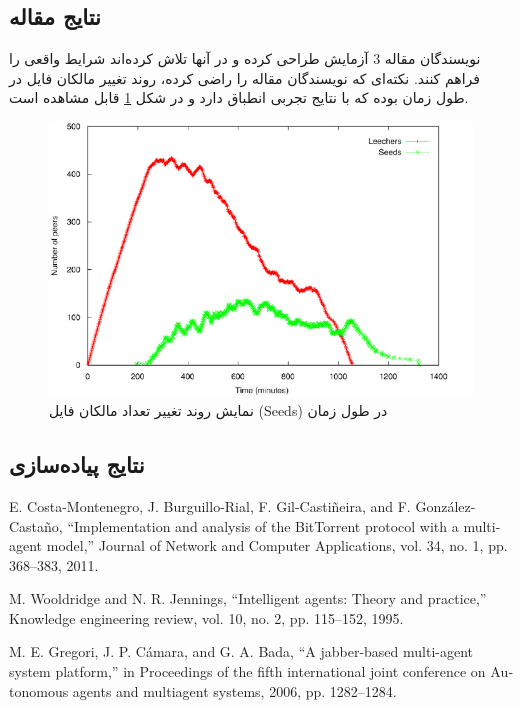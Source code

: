 \documentclass{article}
\begin{document}
\subsection{نتایج مقاله}
نویسندگان مقاله 3 آزمایش طراحی کرده و در آنها تلاش کرده‌اند شرایط واقعی را فراهم کنند. نکته‌ای که نویسندگان مقاله را راضی کرده، روند تغییر مالکان فایل در طول زمان بوده که با نتایج تجربی انطباق دارد و در شکل \ref{fig:experiment} قابل مشاهده است.

\begin{figure} \centerline{\includegraphics{experiment}} \caption{\label{fig:experiment}
 نمایش روند تغییر تعداد مالکان فایل (Seeds) در طول زمان
 } \end{figure}

\subsection{نتایج پیاده‌سازی}


\renewcommand*{\refname}{\section{منابع}}
\begin{thebibliography}{9}
\begin{latin}

E. Costa-Montenegro, J. Burguillo-Rial, F. Gil-Castiñeira, and F. González-Castaño, “Implementation and analysis of the BitTorrent protocol with a multi-agent model,” Journal of Network and Computer Applications, vol. 34, no. 1, pp. 368–383, 2011.

M. Wooldridge and N. R. Jennings, “Intelligent agents: Theory and practice,” Knowledge engineering review, vol. 10, no. 2, pp. 115–152, 1995.

M. E. Gregori, J. P. Cámara, and G. A. Bada, “A jabber-based multi-agent system platform,” in Proceedings of the fifth international joint conference on Autonomous agents and multiagent systems, 2006, pp. 1282–1284.

\end{latin}
\end{thebibliography}
\end{document}
